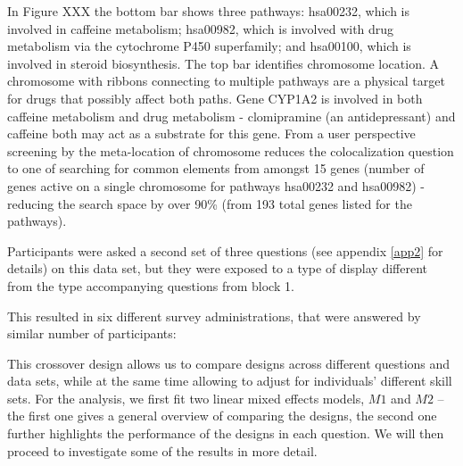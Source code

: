 In Figure XXX the bottom bar shows three pathways: hsa00232, which is involved in caffeine metabolism; hsa00982, which is involved with drug metabolism via the cytochrome P450 superfamily; and hsa00100, which is involved in steroid biosynthesis. The top bar identifies chromosome location. A chromosome with ribbons connecting to multiple pathways are a physical target for drugs that possibly affect both paths. Gene CYP1A2 is involved in both caffeine metabolism and drug metabolism - clomipramine (an antidepressant) and caffeine both may act as a substrate for this gene. From a user perspective screening by the meta-location of chromosome reduces the colocalization question to one of searching for common elements from amongst 15 genes (number of genes active on a single chromosome for pathways hsa00232 and hsa00982) - reducing the search space by over 90\% (from 193 total genes listed for the pathways).

 
Participants were asked a second set of three questions (see appendix \ref{app2} for details) on this data set, but they were exposed to a  type of display different from the type accompanying questions from block 1.
  
This resulted in six different survey administrations, that were answered by similar number of participants: 

{ 
}


\noindent
This crossover design allows us to compare designs across different questions and data sets, while at the same time allowing to adjust for individuals' different skill sets. 
For the analysis, we first fit two linear mixed effects models, $M1$ and $M2$ -- the first one gives a general overview of comparing the designs, the second one further highlights the performance of the designs in each question.
We will then proceed to investigate some of the results in more detail.





